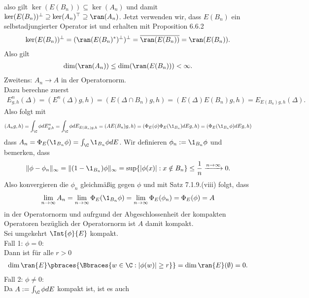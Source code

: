 \begin{solution}
also gilt $\ker(E(B_n)) \subseteq \ker(A_n)$ und damit
$\ker(E(B_n))^{\bot} \supseteq \ker(A_n)^{\top} \supseteq \ran(A_n)$.
Jetzt verwenden wir, dass $E(B_n)$ ein selbstadjungierter
Operator ist und erhalten mit Proposition 6.6.2
\begin{align*}
  \ker(E(B_n))^{\bot} = (\ran(E(B_n)^*)^{\bot})^{\bot} = \overline{\ran(E(B_n))}
  = \ran(E(B_n)).
\end{align*}
Also gilt
\begin{align*}
  \dim(\ran(A_n)) \leq \dim(\ran(E(B_n))) < \infty.
\end{align*}
Zweitens: $A_n \to A$ in der Operatornorm. \\
Dazu berechne zuerst
\begin{align*}
  E_{g,h}^n(\Delta) = (E^n(\Delta)g,h) = (E(\Delta \cap B_n)g,h) = (E(\Delta)E(B_n)g,h)
  = E_{E(B_n)g,h}(\Delta).
\end{align*}
Also folgt mit
\begin{align*}
    (A_ng,h) = \int_{\C}\phi dE_{g,h}^n = \int_{\C}\phi dE_{E(B_n)g,h} = (AE(B_n)g,h)
    = (\Phi_E(\phi)\Phi_E(\1_{B_n}) dE g,h) = (\Phi_E(\1_{B_n}\phi) dE g,h)
\end{align*}
dass $A_n = \Phi_E(\1_{B_n}\phi) = \int_{\C} \1_{B_n}\phi dE$.
Wir definieren $\phi_n := \1_{B_n}\phi$ und bemerken, dass
\begin{align*}
  \|\phi - \phi_n\|_{\infty} = \|(1 - \1_{B_n})\phi\|_{\infty} = \sup\{|\phi(x)|: x \notin B_n\}
  \leq \frac{1}{n} \xrightarrow{n \to \infty} 0.
\end{align*}
Also konvergieren die $\phi_n$ gleichmäßig gegen $\phi$ und mit Satz 7.1.9.(viii)
folgt, dass
\begin{align*}
  \lim_{n \to \infty} A_n = \lim_{n \to \infty}\Phi_E(\1_{B_n}\phi) =
  \lim_{n \to \infty}\Phi_E(\phi_n) = \Phi_E(\phi) = A
\end{align*}
in der Operatornorm und aufrgund der Abgeschlossenheit der kompakten Operatoren
bezüglich der Operatornorm ist $A$ damit kompakt. \\
Sei umgekehrt $\Int{\phi}{E}$ kompakt. \\
Fall 1: $\phi = 0$: \\
Dann ist für alle $r > 0$
\begin{align*}
  \dim{\ran{E}}\pbraces{\Bbraces{w \in \C:|\phi(w)| \geq r}}
  = \dim{\ran{E}}(\emptyset) = 0.
\end{align*}
Fall 2: $\phi \neq 0:$ \\
Da $A := \int_{\C} \phi dE$ kompakt ist, ist es auch
\begin{align*}

\end{align*}
\end{solution}
